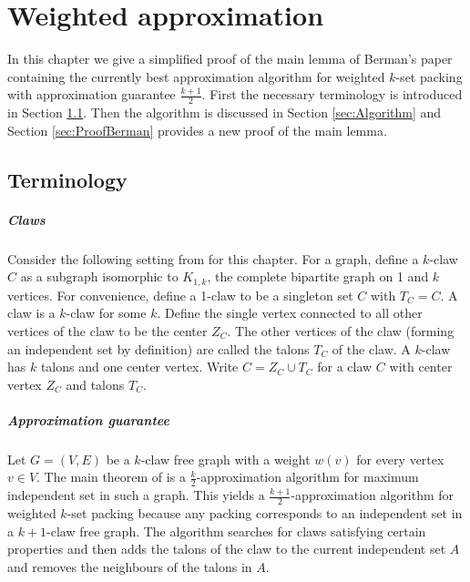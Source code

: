 \chapter{Weighted approximation}\label{chap:Weighted}

In this chapter we give a simplified proof of the main lemma of Berman's paper \cite{Berman} containing the currently best approximation algorithm for weighted $k$-set packing with approximation guarantee $\frac{k+1}{2}$. First the necessary terminology is introduced in Section \ref{sec:Terminology}. Then the algorithm is discussed in Section \ref{sec:Algorithm} and Section \ref{sec:ProofBerman} provides a new proof of the main lemma.

\section{Terminology}\label{sec:Terminology}

\paragraph{Claws} Consider the following setting from \cite{Berman} for this chapter. For a graph, define a $k$-claw $C$ as a subgraph isomorphic to $K_{1,k}$, the complete bipartite graph on 1 and $k$ vertices. For convenience, define a 1-claw to be a singleton set $C$ with $T_C = C$. A claw is a $k$-claw for some $k$. Define the single vertex connected to all other vertices of the claw to be the center $Z_C$. The other vertices of the claw (forming an independent set by definition) are called the talons $T_C$ of the claw. A $k$-claw has $k$ talons and one center vertex. Write $C = Z_C \cup T_C$ for a claw $C$ with center vertex $Z_C$ and talons $T_C$.

\paragraph{Approximation guarantee} Let $G = (V,E)$ be a $k$-claw free graph with a weight $w(v)$ for every vertex $v \in V$. The main theorem of \cite{Berman} is a $\frac{k}{2}$-approximation algorithm for maximum independent set in such a graph. This yields a $\frac{k+1}{2}$-approximation algorithm for weighted $k$-set packing because any packing corresponds to an independent set in a $k+1$-claw free graph. The algorithm searches for claws satisfying certain properties and then adds the talons of the claw to the current independent set $A$ and removes the neighbours of the talons in $A$.

